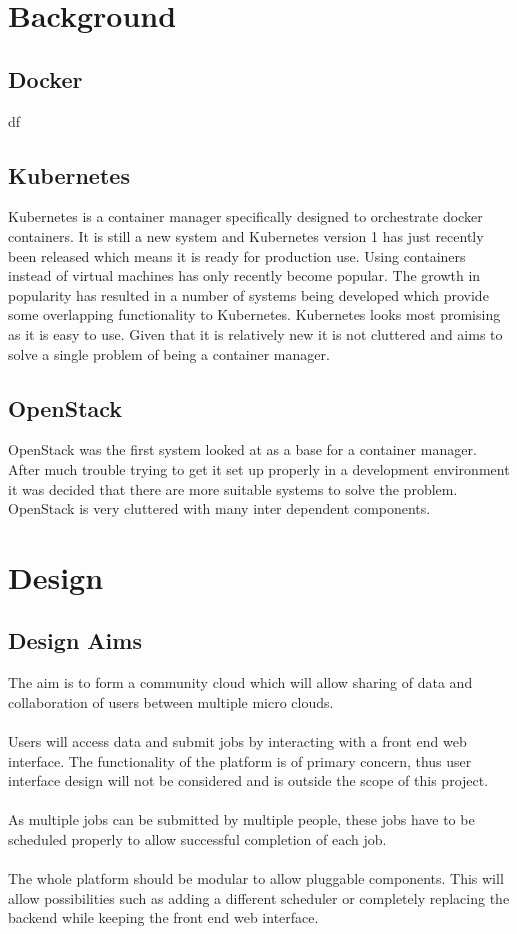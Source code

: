 \documentclass{sig-alternate-05-2015}
\begin{document}
\section{Background}

\subsection{Docker}
df
\subsection{Kubernetes}
Kubernetes is a container manager specifically designed to orchestrate docker containers. It is still a new system and Kubernetes version 1 has just recently been released which means it is ready for production use. Using containers instead of virtual machines has only recently become popular. The growth in popularity has resulted in a number of systems being developed which provide some overlapping functionality to Kubernetes. Kubernetes looks most promising as it is easy to use. Given that it is relatively new it is not cluttered and aims to solve a single problem of being a container manager. 

\subsection{OpenStack}
OpenStack was the first system looked at as a base for a container manager. After much trouble trying to get it set up properly in a development environment it was decided that there are more suitable systems to solve the problem. OpenStack is very cluttered with many inter dependent components.

\section{Design}


\subsection{Design Aims}
The aim is to form a community cloud which will allow sharing of data and collaboration of users between multiple micro clouds.
\\\\
Users will access data and submit jobs by interacting with a front end web interface. The functionality of the platform is of primary concern, thus user interface design will not be considered and is outside the scope of this project. 
\\\\
As multiple jobs can be submitted by multiple people, these jobs have to be scheduled properly to allow successful completion of each job. 
\\\\
The whole platform should be modular to allow pluggable components. This will allow possibilities such as adding a different scheduler or completely replacing the backend while keeping the front end web interface.
\end{document}
